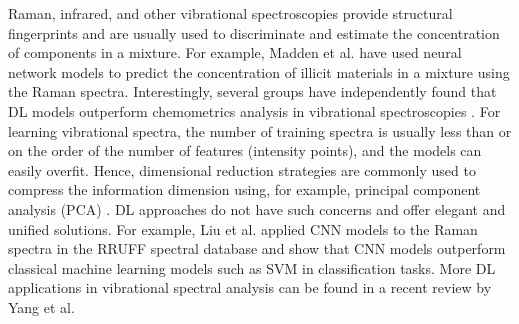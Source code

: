 \documentclass[pdflatex,sn-mathphys]{sn-jnl}%
\theoremstyle{thmstyleone}%
\theoremstyle{thmstyletwo}%
\theoremstyle{thmstylethree}%
\begin{document}
Raman, infrared, and other vibrational spectroscopies provide structural fingerprints and are usually used to discriminate and estimate the concentration of components in a mixture. For example, Madden et al. \cite{maddenMachineLearningMethods2003} have used neural network models to predict the concentration of illicit materials in a mixture using the Raman spectra. Interestingly, several groups have independently found that DL models outperform chemometrics analysis in vibrational spectroscopies \cite{conroyQualitativeQuantitativeAnalysis2005, acquarelliConvolutionalNeuralNetworks2017}. For learning vibrational spectra, the number of training spectra is usually less than or on the order of the number of features (intensity points), and the models can easily overfit. Hence, dimensional reduction strategies are commonly used to compress the information dimension using, for example, principal component analysis (PCA) \cite{oconnellClassificationTargetAnalyte2005, zhaoQualitativeIdentificationTea2006}. DL approaches do not have such concerns and offer elegant and unified solutions. For example, Liu et al.\cite{liuDeepConvolutionalNeural2017} applied CNN models to the Raman spectra in the RRUFF spectral database and show that CNN models outperform classical machine learning models such as SVM in classification tasks. More DL applications in vibrational spectral analysis can be found in a recent review by Yang et al. \cite{yangDeepLearningVibrational2019}
\end{document}

